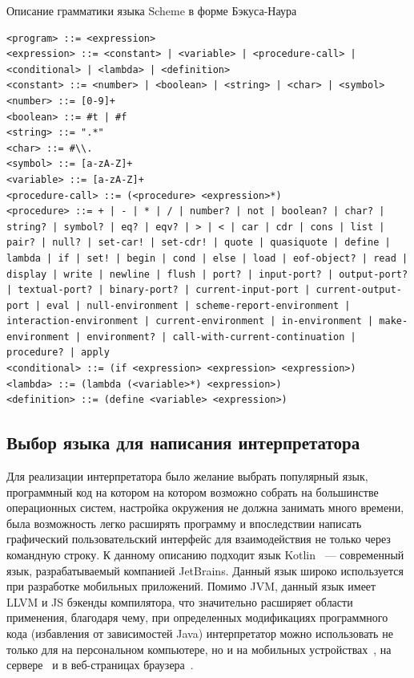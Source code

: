 \documentclass[14pt, russian]{scrartcl}
\begin{document}
\begin{listing}[!htb]
\caption{Описание грамматики языка Scheme в форме Бэкуса-Наура}
\label{lst:schemebnf}
\begin{verbatim}
<program> ::= <expression>
<expression> ::= <constant> | <variable> | <procedure-call> | <conditional> | <lambda> | <definition>
<constant> ::= <number> | <boolean> | <string> | <char> | <symbol>
<number> ::= [0-9]+
<boolean> ::= #t | #f
<string> ::= ".*"
<char> ::= #\\.
<symbol> ::= [a-zA-Z]+
<variable> ::= [a-zA-Z]+
<procedure-call> ::= (<procedure> <expression>*)
<procedure> ::= + | - | * | / | number? | not | boolean? | char? | string? | symbol? | eq? | eqv? | > | < | car | cdr | cons | list | pair? | null? | set-car! | set-cdr! | quote | quasiquote | define | lambda | if | set! | begin | cond | else | load | eof-object? | read | display | write | newline | flush | port? | input-port? | output-port? | textual-port? | binary-port? | current-input-port | current-output-port | eval | null-environment | scheme-report-environment | interaction-environment | current-environment | in-environment | make-environment | environment? | call-with-current-continuation | procedure? | apply
<conditional> ::= (if <expression> <expression> <expression>)
<lambda> ::= (lambda (<variable>*) <expression>)
<definition> ::= (define <variable> <expression>)
\end{verbatim}
\end{listing}

\subsection{Выбор языка для написания интерпретатора}

Для реализации интерпретатора было желание выбрать популярный язык, программный код на котором на котором возможно собрать на большинстве операционных систем, настройка окружения не должна занимать много времени, была возможность легко расширять программу и впоследствии написать графический пользовательский интерфейс для взаимодействия не только через командную строку.
К данному описанию подходит язык Kotlin~\cite{Kotlindocs} --- современный язык, разрабатываемый компанией JetBrains.
Данный язык широко используется при разработке мобильных приложений.
Помимо JVM, данный язык имеет LLVM и JS бэкенды компилятора, что значительно расширяет области применения, благодаря чему, при определенных модификациях программного кода (избавления от зависимостей Java) интерпретатор можно использовать не только для на персональном компьютере, но и на мобильных устройствах~\cite{Kmm}, на сервере~\cite{Kserv} и в веб-страницах браузера~\cite{Kjs}.
\end{document}
